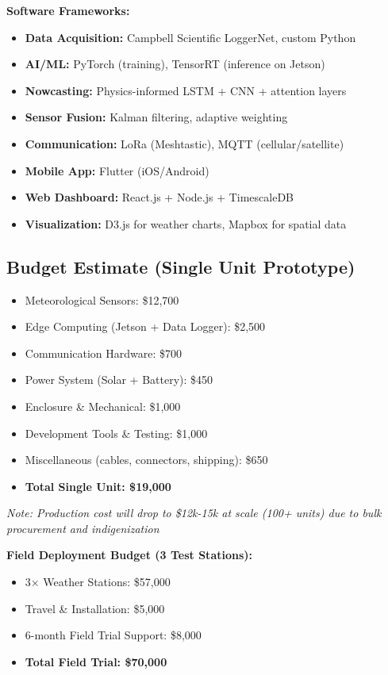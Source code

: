 \textbf{Software Frameworks:}
\begin{itemize}
    \item \textbf{Data Acquisition:} Campbell Scientific LoggerNet, custom Python
    \item \textbf{AI/ML:} PyTorch (training), TensorRT (inference on Jetson)
    \item \textbf{Nowcasting:} Physics-informed LSTM + CNN + attention layers
    \item \textbf{Sensor Fusion:} Kalman filtering, adaptive weighting
    \item \textbf{Communication:} LoRa (Meshtastic), MQTT (cellular/satellite)
    \item \textbf{Mobile App:} Flutter (iOS/Android)
    \item \textbf{Web Dashboard:} React.js + Node.js + TimescaleDB
    \item \textbf{Visualization:} D3.js for weather charts, Mapbox for spatial data
\end{itemize}

\subsection{Budget Estimate (Single Unit Prototype)}

\begin{itemize}
    \item Meteorological Sensors: \$12,700
    \item Edge Computing (Jetson + Data Logger): \$2,500
    \item Communication Hardware: \$700
    \item Power System (Solar + Battery): \$450
    \item Enclosure \& Mechanical: \$1,000
    \item Development Tools \& Testing: \$1,000
    \item Miscellaneous (cables, connectors, shipping): \$650
    \item \textbf{Total Single Unit: \$19,000}
\end{itemize}

\textit{Note: Production cost will drop to \$12k-15k at scale (100+ units) due to bulk procurement and indigenization}

\textbf{Field Deployment Budget (3 Test Stations):}
\begin{itemize}
    \item 3× Weather Stations: \$57,000
    \item Travel \& Installation: \$5,000
    \item 6-month Field Trial Support: \$8,000
    \item \textbf{Total Field Trial: \$70,000}
\end{itemize}

